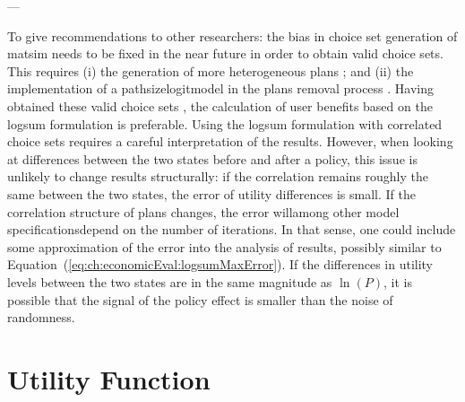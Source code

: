 ---

To give recommendations to other researchers: the bias in choice set generation of \gls{matsim} needs to be fixed in the near future in order to obtain valid choice sets.
%
This requires (i) the generation of more heterogeneous plans \citep[see, e.g.,][for such attempts in the \acrshort{pt} and in the car mode, respectively]{Moyo2013PhD, NagelKickhoeferJoubert2014HeterogeneousVoTsPROCEDIA}; and (ii) the implementation of a \gls{pathsizelogitmodel} in the plans removal process \citep[see, e.g.,][]{Grether2014PhD}.
%
Having obtained these valid choice sets \citep{NagelFloetteroed2009IatbrResourceInBook}, the calculation of user benefits based on the \gls{logsum} formulation is preferable.
%
%
Using the logsum formulation with correlated choice sets requires a careful interpretation of the results. However, when looking at differences between the two states before and after a policy, this issue is unlikely to change results structurally: if the correlation remains roughly the same between the two states, the error of utility differences is small. If the correlation structure of plans changes, the error will\textemdash among other model specifications\textemdash depend on the number of iterations.
%
%
In that sense, one could include some approximation of the error into the analysis of results, possibly similar to Equation~(\ref{eq:ch:economicEval:logsumMaxError}). If the differences in utility levels between the two states are in the same magnitude as $\ln(P)$, it is possible that the signal of the policy effect is smaller than the noise of randomness.

\section{Utility Function}
\label{sec:future-of-scoring-function}


